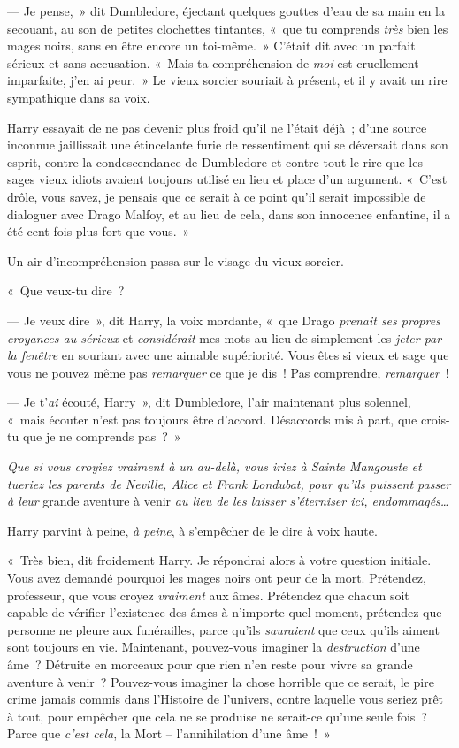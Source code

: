 --- Je pense,~» dit Dumbledore, éjectant quelques gouttes d'eau de sa main en la secouant, au son de petites clochettes tintantes, «~que tu comprends \emph{très} bien les mages noirs, sans en être encore un toi-même.~»
C'était dit avec un parfait sérieux et sans accusation.
«~Mais ta compréhension de \emph{moi} est cruellement imparfaite, j'en ai peur.~»
Le vieux sorcier souriait à présent, et il y avait un rire sympathique dans sa voix.

Harry essayait de ne pas devenir plus froid qu'il ne l'était déjà~; d'une source inconnue jaillissait une étincelante furie de ressentiment qui se déversait dans son esprit, contre la condescendance de Dumbledore et contre tout le rire que les sages vieux idiots avaient toujours utilisé en lieu et place d'un argument.
«~C'est drôle, vous savez, je pensais que ce serait à ce point qu'il serait impossible de dialoguer avec Drago Malfoy, et au lieu de cela, dans son innocence enfantine, il a été cent fois plus fort que vous.~»

Un air d'incompréhension passa sur le visage du vieux sorcier.

«~Que veux-tu dire~?

--- Je veux dire~», dit Harry, la voix mordante, «~que Drago \emph{prenait ses propres croyances au sérieux} et \emph{considérait} mes mots au lieu de simplement les \emph{jeter par la fenêtre} en souriant avec une aimable supériorité.
Vous êtes si vieux et sage que vous ne pouvez même pas \emph{remarquer} ce que je dis~!
Pas comprendre, \emph{remarquer}~!

--- Je t'\emph{ai} écouté, Harry~», dit Dumbledore, l'air maintenant plus solennel, «~mais écouter n'est pas toujours être d'accord.
Désaccords mis à part, que crois-tu que je ne comprends pas~?~»

\emph{Que si vous croyiez vraiment à un au-delà, vous iriez à Sainte Mangouste et tueriez les parents de Neville, Alice et Frank Londubat, pour qu'ils puissent passer à leur} grande aventure à venir \emph{au lieu de les laisser s'éterniser ici, endommagés…}

Harry parvint à peine, \emph{à peine}, à s'empêcher de le dire à voix haute.

«~Très bien, dit froidement Harry.
Je répondrai alors à votre question initiale.
Vous avez demandé pourquoi les mages noirs ont peur de la mort.
Prétendez, professeur, que vous croyez \emph{vraiment} aux âmes.
Prétendez que chacun soit capable de vérifier l'existence des âmes à n'importe quel moment, prétendez que personne ne pleure aux funérailles, parce qu'ils \emph{sauraient} que ceux qu'ils aiment sont toujours en vie.
Maintenant, pouvez-vous imaginer la \emph{destruction} d'une âme~?
Détruite en morceaux pour que rien n'en reste pour vivre sa grande aventure à venir~?
Pouvez-vous imaginer la chose horrible que ce serait, le pire crime jamais commis dans l'Histoire de l'univers, contre laquelle vous seriez prêt à tout, pour empêcher que cela ne se produise ne serait-ce qu'une seule fois~?
Parce que \emph{c'est cela}, la Mort -- l'annihilation d'une âme~!~»


